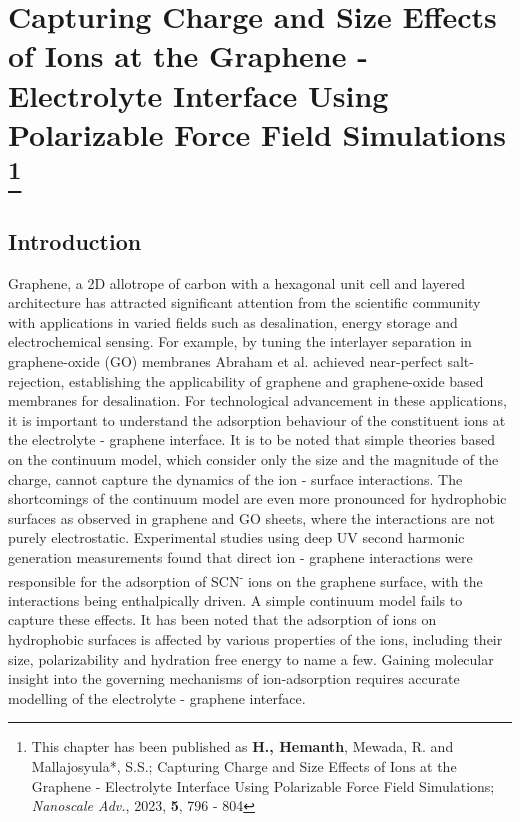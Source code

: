 \chapter[Capturing Charge and Size Effects of Ions at the Graphene - Electrolyte Interface Using Polarizable Force Field Simulations]{Capturing Charge and Size Effects of Ions at the Graphene - Electrolyte Interface Using Polarizable Force Field Simulations \protect\footnote[4]{This chapter has been published as \textbf{H., Hemanth}, Mewada, R. and Mallajosyula*, S.S.; Capturing Charge and Size Effects of Ions at the Graphene - Electrolyte Interface Using Polarizable Force Field Simulations; {\textit{Nanoscale Adv.}, 2023, \textbf{5}, 796 - 804}}}
\section{Introduction}
Graphene, a 2D allotrope of carbon with a hexagonal unit cell and layered architecture has attracted significant attention from the scientific community with applications in varied fields such as desalination,\supercite{sun_selective_2014,joshi_precise_2014,homaeigohar_graphene_2017,boretti_outlook_2018,yang_ultrathin_2017} energy storage\supercite{liang_graphene-based_2009,wang_supercapacitor_2009,wang_sngraphene_2009,stoller_graphene-based_2008} and electrochemical sensing.\supercite{sheng_electrochemical_2012,pumera_graphene_2010,pumera_electrochemistry_2009} For example, by tuning the interlayer separation in graphene-oxide (GO) membranes Abraham et al. achieved near-perfect salt-rejection, establishing the applicability of graphene and graphene-oxide based membranes for desalination.\supercite{abraham_tunable_2017,nair_unimpeded_2012} For technological advancement in these applications, it is important to understand the adsorption behaviour of the constituent ions at the electrolyte - graphene interface. It is to be noted that simple theories based on the continuum model, which consider only the size and the magnitude of the charge, cannot capture the dynamics of the ion - surface interactions. The shortcomings of the continuum model are even more pronounced for hydrophobic surfaces as observed in graphene and GO sheets, where the interactions are not purely electrostatic.\supercite{mennucci_polarizable_2002} Experimental studies using deep UV second harmonic generation measurements found that direct ion - graphene interactions were responsible for the adsorption of SCN\textsuperscript{-} ions on the graphene surface, with the interactions being enthalpically driven.\supercite{mccaffrey_mechanism_2017} A simple continuum model fails to capture these effects. It has been noted that the adsorption of ions on hydrophobic surfaces is affected by various properties of the ions, including their size, polarizability and hydration free energy to name a few.\supercite{iamprasertkun_capacitance_2019,glendening_dicationwater_1996} Gaining molecular insight into the governing mechanisms of ion-adsorption requires accurate modelling of the electrolyte - graphene interface.


